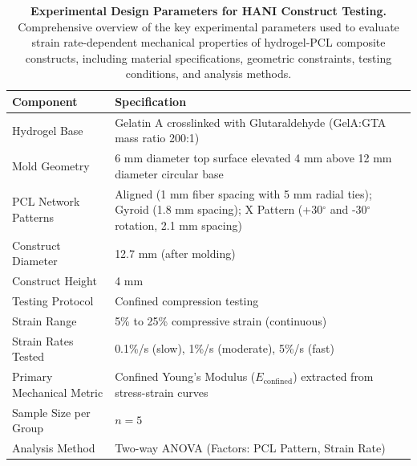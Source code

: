 \begin{table}[H]
\centering
\renewcommand{\arraystretch}{1.3}
\setlength{\tabcolsep}{12pt}
\caption{\textbf{Experimental Design Parameters for HANI Construct Testing.} Comprehensive overview of the key experimental parameters used to evaluate strain rate-dependent mechanical properties of hydrogel-PCL composite constructs, including material specifications, geometric constraints, testing conditions, and analysis methods.}
\label{tab:test_design}
\begin{tabular}{|p{4cm}|p{10cm}|}
\hline
\rowcolor{gray!20}
\textbf{Component} & \textbf{Specification} \\ \hline
Hydrogel Base & Gelatin A crosslinked with Glutaraldehyde (GelA:GTA mass ratio 200:1) \\ \hline
Mold Geometry & 6 mm diameter top surface elevated 4 mm above 12 mm diameter circular base \\ \hline
PCL Network Patterns & Aligned (1 mm fiber spacing with 5 mm radial ties); Gyroid (1.8 mm spacing); X Pattern (+30$^\circ$ and -30$^\circ$ rotation, 2.1 mm spacing) \\ \hline
Construct Diameter & 12.7 mm (after molding) \\ \hline
Construct Height & 4 mm \\ \hline
Testing Protocol & Confined compression testing \\ \hline
Strain Range & 5\% to 25\% compressive strain (continuous) \\ \hline
Strain Rates Tested & 0.1\%/s (slow), 1\%/s (moderate), 5\%/s (fast) \\ \hline
Primary Mechanical Metric & Confined Young's Modulus ($E_{\text{confined}}$) extracted from stress-strain curves \\ \hline
Sample Size per Group & \(n = 5\) \\ \hline
Analysis Method & Two-way ANOVA (Factors: PCL Pattern, Strain Rate) \\ \hline
\end{tabular}
\end{table}


